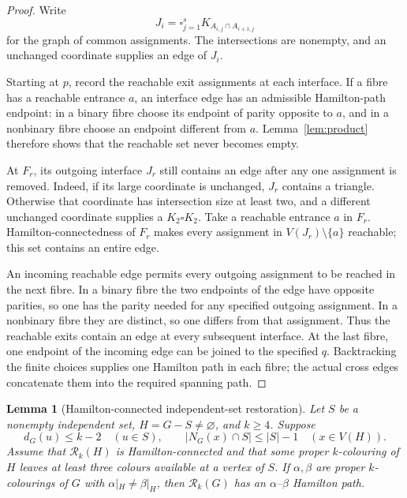 \documentclass[11pt]{article}
\newtheorem{lemma}[theorem]{Lemma}
\theoremstyle{remark}
\newcommand{\Rk}{\mathcal R_k}
\numberwithin{equation}{section}
\numberwithin{table}{section}
\begin{document}
\begin{proof}
Write
\[
 J_i=\square_{j=1}^s K_{A_{i,j}\cap A_{i+1,j}}
\]
for the graph of common assignments.  The intersections are nonempty,
and an unchanged coordinate supplies an edge of $J_i$.

Starting at $p$, record the reachable exit assignments at each
interface.  If a fibre has a reachable entrance $a$, an interface edge
has an admissible Hamilton-path endpoint: in a binary fibre choose its
endpoint of parity opposite to $a$, and in a nonbinary fibre choose an
endpoint different from $a$.  Lemma~\ref{lem:product} therefore shows
that the reachable set never becomes empty.

At $F_r$, its outgoing interface $J_r$ still contains an edge after any
one assignment is removed.  Indeed, if its large coordinate is
unchanged, $J_r$ contains a triangle.  Otherwise that coordinate has
intersection size at least two, and a different unchanged coordinate
supplies a $K_2\square K_2$.  Take a reachable entrance $a$ in $F_r$.
Hamilton-connectedness of $F_r$ makes every assignment in
$V(J_r)\setminus\{a\}$ reachable; this set contains an entire edge.

An incoming reachable edge permits every outgoing assignment to be
reached in the next fibre.  In a binary fibre the two endpoints of the
edge have opposite parities, so one has the parity needed for any
specified outgoing assignment.  In a nonbinary fibre they are distinct,
so one differs from that assignment.  Thus the reachable exits contain
an edge at every subsequent interface.  At the last fibre, one endpoint
of the incoming edge can be joined to the specified $q$.  Backtracking
the finite choices supplies one Hamilton path in each fibre; the actual
cross edges concatenate them into the required spanning path.
\end{proof}

\begin{lemma}[Hamilton-connected independent-set restoration]
\label{lem:independent-hc}
Let $S$ be a nonempty independent set, $H=G-S\ne\varnothing$, and
$k\ge4$.  Suppose
\[
 d_G(u)\le k-2\quad(u\in S),\qquad
 |N_G(x)\cap S|\le |S|-1\quad(x\in V(H)).
\]
Assume that $\Rk(H)$ is Hamilton-connected and that some proper
$k$-colouring of $H$ leaves at least three colours available at a vertex
of $S$.  If $\alpha,\beta$ are proper $k$-colourings of $G$ with
$\alpha|_H\ne\beta|_H$, then $\Rk(G)$ has an
$\alpha$--$\beta$ Hamilton path.
\end{lemma}
\end{document}
